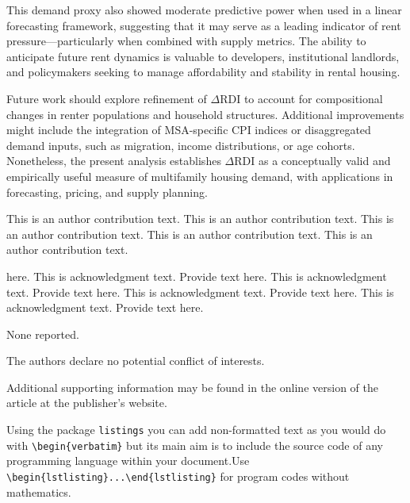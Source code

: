 \documentclass[APA,Times1COL]{WileyNJDv5} %
\begin{document}
This demand proxy also showed moderate predictive power when used in a linear forecasting framework, suggesting that it may serve as a leading indicator of rent pressure---particularly when combined with supply metrics. The ability to anticipate future rent dynamics is valuable to developers, institutional landlords, and policymakers seeking to manage affordability and stability in rental housing.

Future work should explore refinement of \(\Delta\text{RDI}\) to account for compositional changes in renter populations and household structures. Additional improvements might include the integration of MSA-specific CPI indices or disaggregated demand inputs, such as migration, income distributions, or age cohorts. Nonetheless, the present analysis establishes \(\Delta\text{RDI}\) as a conceptually valid and empirically useful measure of multifamily housing demand, with applications in forecasting, pricing, and supply planning.


{}

This is an author contribution text. This is an author contribution text. This is an author contribution text. This is an author contribution text. This is an author contribution text.

 here. This is acknowledgment text. Provide text here. This is acknowledgment text. Provide text here. This is acknowledgment text. Provide text here. This is acknowledgment text. Provide text here.



None reported.


The authors declare no potential conflict of interests.





Additional supporting information may be found in the
online version of the article at the publisher’s website.




\appendix

\vspace*{12pt}
Using the package {\tt listings} you can add non-formatted text as you would do with \verb|\begin{verbatim}| but its main aim is to include the source code of any programming language within your document.\newline Use \verb|\begin{lstlisting}...\end{lstlisting}| for program codes without mathematics.
\end{document}

